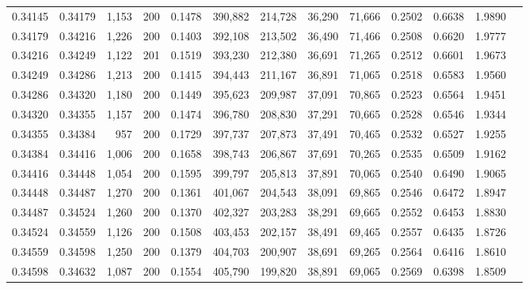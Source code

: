 \begin{tabular}{rrrrrrrrrrrrr}
0.34145 & 0.34179 & 1,153 & 200 &                                     0.1478 & 390,882 & 214,728 &  36,290 &  71,666 & 0.2502 & 0.6638 & 1.9890 \\
0.34179 & 0.34216 & 1,226 & 200 &                                     0.1403 & 392,108 & 213,502 &  36,490 &  71,466 & 0.2508 & 0.6620 & 1.9777 \\
0.34216 & 0.34249 & 1,122 & 201 &                                     0.1519 & 393,230 & 212,380 &  36,691 &  71,265 & 0.2512 & 0.6601 & 1.9673 \\
0.34249 & 0.34286 & 1,213 & 200 &                                     0.1415 & 394,443 & 211,167 &  36,891 &  71,065 & 0.2518 & 0.6583 & 1.9560 \\
0.34286 & 0.34320 & 1,180 & 200 &                                     0.1449 & 395,623 & 209,987 &  37,091 &  70,865 & 0.2523 & 0.6564 & 1.9451 \\
0.34320 & 0.34355 & 1,157 & 200 &                                     0.1474 & 396,780 & 208,830 &  37,291 &  70,665 & 0.2528 & 0.6546 & 1.9344 \\
0.34355 & 0.34384 &   957 & 200 &                                     0.1729 & 397,737 & 207,873 &  37,491 &  70,465 & 0.2532 & 0.6527 & 1.9255 \\
0.34384 & 0.34416 & 1,006 & 200 &                                     0.1658 & 398,743 & 206,867 &  37,691 &  70,265 & 0.2535 & 0.6509 & 1.9162 \\
0.34416 & 0.34448 & 1,054 & 200 &                                     0.1595 & 399,797 & 205,813 &  37,891 &  70,065 & 0.2540 & 0.6490 & 1.9065 \\
0.34448 & 0.34487 & 1,270 & 200 &                                     0.1361 & 401,067 & 204,543 &  38,091 &  69,865 & 0.2546 & 0.6472 & 1.8947 \\
0.34487 & 0.34524 & 1,260 & 200 &                                     0.1370 & 402,327 & 203,283 &  38,291 &  69,665 & 0.2552 & 0.6453 & 1.8830 \\
0.34524 & 0.34559 & 1,126 & 200 &                                     0.1508 & 403,453 & 202,157 &  38,491 &  69,465 & 0.2557 & 0.6435 & 1.8726 \\
0.34559 & 0.34598 & 1,250 & 200 &                                     0.1379 & 404,703 & 200,907 &  38,691 &  69,265 & 0.2564 & 0.6416 & 1.8610 \\
0.34598 & 0.34632 & 1,087 & 200 &                                     0.1554 & 405,790 & 199,820 &  38,891 &  69,065 & 0.2569 & 0.6398 & 1.8509 \\

\end{tabular}
